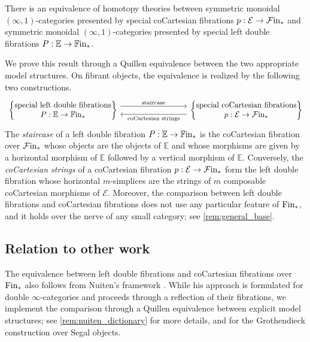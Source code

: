 \documentclass[10pt,reqno]{amsart}
\begin{document}
\begin{unnumberedtheorem}
There is an equivalence of homotopy theories between symmetric monoidal
$(\infty,1)$-categories presented by special coCartesian fibrations
$p:\mathcal E\to\mathcal{F}\mathrm{in}_*$ and symmetric monoidal
$(\infty,1)$-categories presented by special left double fibrations
$P:\mathbb E\to\mathbb{F}\mathrm{in}_*$.
\end{unnumberedtheorem}

We prove this result through a Quillen equivalence between the two
appropriate model structures. On fibrant objects, the equivalence is
realized by the following two constructions.
\[
\begin{tikzcd}[ampersand replacement=\&,column sep=8.5em]
\left\{\begin{tabular}{@{}c@{}}special left double fibrations\\
$P:\mathbb E\to\bisimFin$\end{tabular}\right\}
\arrow[r,shift left=1.2ex,"\text{staircase}"]
\&
\left\{\begin{tabular}{@{}c@{}}special coCartesian fibrations\\
$p:\mathcal E\to\simFin$\end{tabular}\right\}
\arrow[l,shift left=1.2ex,"\text{coCartesian strings}"]
\end{tikzcd}
\]
The \emph{staircase} of a left double fibration
$P:\mathbb E\to\mathbb{F}\mathrm{in}_*$ is the coCartesian fibration over
$\mathcal{F}\mathrm{in}_*$ whose objects are the objects of $\mathbb E$ and whose
morphisms are given by a horizontal morphism of $\mathbb E$ followed
by a vertical morphism of $\mathbb E$. Conversely, the
\emph{coCartesian strings} of a coCartesian fibration
$p:\mathcal E\to\mathcal{F}\mathrm{in}_*$ form the left double fibration whose
horizontal $m$-simplices are the strings of $m$ composable
coCartesian morphisms of $\mathcal E$. Moreover, the comparison
between left double fibrations and coCartesian fibrations does not use
any particular feature of $\mathrm{Fin}_*$, and it holds over the nerve of any
small category; see \cref{rem:general_base}.

\subsection*{Relation to other work}
The equivalence between left double fibrations and coCartesian
fibrations over $\mathrm{Fin}_*$ also follows from Nuiten's framework
\cite{Nuiten2023}. While his approach is formulated for double
$\infty$-categories and proceeds through a reflection of their
fibrations, we implement the comparison through a Quillen equivalence
between explicit model structures; see \cref{rem:nuiten_dictionary} for
more details, and \cite{BoavidaDeBrito2018} for the Grothendieck
construction over Segal objects. %
\end{document}
